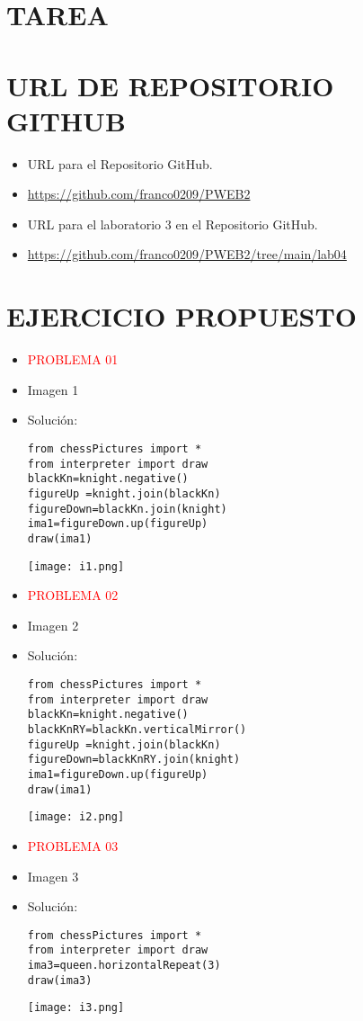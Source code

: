 \documentclass{article}
\begin{document}
\section{TAREA}

\section{URL DE REPOSITORIO GITHUB}
\begin{itemize}
    \item URL para el Repositorio GitHub.
    \item \url{https://github.com/franco0209/PWEB2}
    \item URL para el laboratorio 3 en el Repositorio GitHub.
    \item \url{https://github.com/franco0209/PWEB2/tree/main/lab04}
\end{itemize}

\section{EJERCICIO PROPUESTO}
\begin{itemize}
    \item \textcolor{red}{PROBLEMA 01}
    \item Imagen 1
    \item Solución:
    \begin{lstlisting}
from chessPictures import *
from interpreter import draw
blackKn=knight.negative()
figureUp =knight.join(blackKn)
figureDown=blackKn.join(knight)
ima1=figureDown.up(figureUp)
draw(ima1)
    \end{lstlisting}
    \texttt{[image: i1.png]}
\end{itemize}

\begin{itemize}
    \item \textcolor{red}{PROBLEMA 02}
    \item Imagen 2
    \item Solución:
    \begin{lstlisting}
from chessPictures import *
from interpreter import draw
blackKn=knight.negative()
blackKnRY=blackKn.verticalMirror()
figureUp =knight.join(blackKn)
figureDown=blackKnRY.join(knight)
ima1=figureDown.up(figureUp)
draw(ima1)
    \end{lstlisting}
    \texttt{[image: i2.png]}
\end{itemize}

\begin{itemize}
    \item \textcolor{red}{PROBLEMA 03}
    \item Imagen 3
    \item Solución:
    \begin{lstlisting}
from chessPictures import *
from interpreter import draw
ima3=queen.horizontalRepeat(3)
draw(ima3)
    \end{lstlisting}
    \texttt{[image: i3.png]}
\end{itemize}
\end{document}

